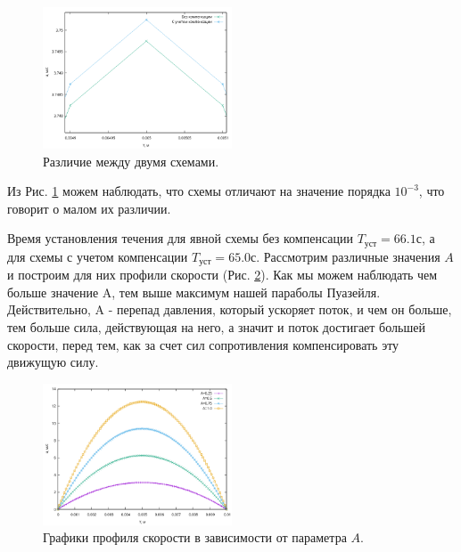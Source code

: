 \begin{figure}[H]
    \centering
    \includegraphics[width=0.5\textwidth]{images/6.png}
    \caption {Различие между двумя схемами.}
    \label{fig:6}
\end{figure}

Из Рис. \ref{fig:6} можем наблюдать, что схемы отличают на значение порядка $10^{-3}$, что говорит о малом их различии.

Время установления течения для явной схемы без компенсации $T_\text{уст}=66.1 \text{с}$, а для схемы с учетом компенсации $T_\text{уст}=65.0 \text{с}$. 
Рассмотрим различные значения $A$ и построим для них профили скорости (Рис. \ref{fig:7}). Как мы можем наблюдать чем больше значение A, тем выше максимум нашей параболы Пуазейля. Действительно, A - перепад давления, который ускоряет поток, и чем он больше, тем больше сила, действующая на него, а значит и поток достигает большей скорости, перед тем, как за счет сил сопротивления компенсировать эту движущую силу. 

\begin{figure}[H]
    \centering
    \includegraphics[width=0.5\textwidth]{images/7.png}
    \caption {Графики профиля скорости в зависимости от параметра $A$.}
    \label{fig:7}
\end{figure}


